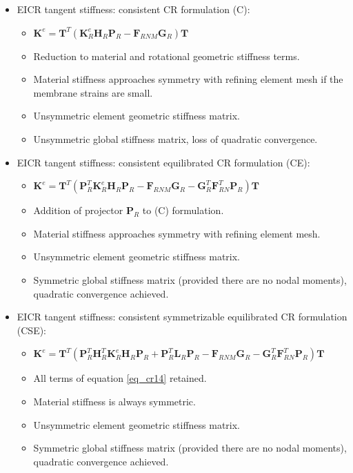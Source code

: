   \begin{itemize}
 	\item EICR tangent stiffness: consistent CR formulation (C):
 	\begin{itemize}
 		\item $\mathbf{K}^e 
 		=
 		\mathbf{T}^T
 		(
 		\mathbf{K}_R^e
 		\mathbf{H}_R
 		\mathbf{P}_R
 		-
 		\mathbf{F}_{RNM}
 		\mathbf{G}_R
 		)
 		\mathbf{T}$
		\item Reduction to material and rotational geometric stiffness terms.
		\item Material stiffness approaches symmetry with refining element mesh if the membrane strains are small.
 		\item Unsymmetric element geometric stiffness matrix.
 		\item Unsymmetric global stiffness matrix, loss of quadratic convergence.
 	\end{itemize}
 	\item EICR tangent stiffness: consistent equilibrated CR formulation (CE):
 	\begin{itemize}
 		\item $\mathbf{K}^e 
 		=
 		\mathbf{T}^T
 		(
 		\mathbf{P}_R^T
 		\mathbf{K}_R^e
 		\mathbf{H}_R
 		\mathbf{P}_R
 		-
 		\mathbf{F}_{RNM}
 		\mathbf{G}_R
 		-
 		\mathbf{G}_R^T
 		\mathbf{F}_{RN}^T
 		\mathbf{P}_R
 		)
 		\mathbf{T}$
 		\item Addition of projector $\mathbf{P}_R$ to (C) formulation.
 		\item Material stiffness approaches symmetry with refining element mesh.
 		\item Unsymmetric element geometric stiffness matrix.
 		\item Symmetric global stiffness matrix (provided there are no nodal moments), quadratic convergence achieved.
 	\end{itemize}
 	\item EICR tangent stiffness: consistent symmetrizable equilibrated CR formulation (CSE):
 		\begin{itemize}
 		\item $\mathbf{K}^e 
 		=
 		\mathbf{T}^T
 		(
 		\mathbf{P}_R^T
 		\mathbf{H}_R^T
 		\mathbf{K}_R^e
 		\mathbf{H}_R
 		\mathbf{P}_R
 		+
 		\mathbf{P}_R^T
 		\mathbf{L}_R
 		\mathbf{P}_R
 		-
 		\mathbf{F}_{RNM}
 		\mathbf{G}_R
 		-
 		\mathbf{G}_R^T
 		\mathbf{F}_{RN}^T
 		\mathbf{P}_R
 		)
 		\mathbf{T}$
 		\item All terms of equation \ref{eq_cr14} retained. 
 		\item Material stiffness is always symmetric.
 		\item Unsymmetric element geometric stiffness matrix.
 		\item Symmetric global stiffness matrix (provided there are no nodal moments), quadratic convergence achieved.
 	\end{itemize}
 \end{itemize}

